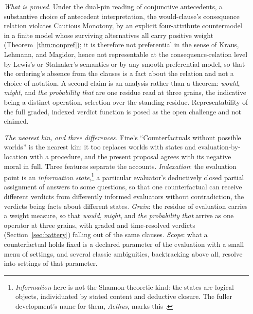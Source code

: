 \emph{What is proved.} Under the dual-pin reading of conjunctive antecedents, a substantive choice of antecedent interpretation, the would-clause's consequence relation violates Cautious Monotony, by an explicit four-attribute countermodel in a finite model whose surviving alternatives all carry positive weight (Theorem~\ref{thm:nonpref}); it is therefore not preferential in the sense of Kraus, Lehmann, and Magidor, hence not representable at the consequence-relation level by Lewis's or Stalnaker's semantics or by any smooth preferential model, so that the ordering's absence from the clauses is a fact about the relation and not a choice of notation. A second claim is an analysis rather than a theorem: \emph{would}, \emph{might}, and \emph{the probability that} are one residue read at three grains, the indicative being a distinct operation, selection over the standing residue. Representability of the full graded, indexed verdict function is posed as the open challenge and not claimed.

\emph{The nearest kin, and three differences.} Fine's ``Counterfactuals without possible worlds'' \parencite*{fine2012} is the nearest kin: it too replaces worlds with states and evaluation-by-location with a procedure, and the present proposal agrees with its negative moral in full. Three features separate the accounts. \emph{Indexation}: the evaluation point is an \emph{information state},\footnote{\emph{Information} here is not the Shannon-theoretic kind: the states are logical objects, individuated by stated content and deductive closure. The fuller development's name for them, \emph{Aethus}, marks this \parencite{Aethus}.} a particular evaluator's deductively closed partial assignment of answers to some questions, so that one counterfactual can receive different verdicts from differently informed evaluators without contradiction, the verdicts being facts about different states. \emph{Grain}: the residue of evaluation carries a weight measure, so that \emph{would}, \emph{might}, and \emph{the probability that} arrive as one operator at three grains, with graded and time-resolved verdicts (Section~\ref{sec:battery}) falling out of the same clauses. \emph{Scope}: what a counterfactual holds fixed is a declared parameter of the evaluation with a small menu of settings, and several classic ambiguities, backtracking above all, resolve into settings of that parameter.

